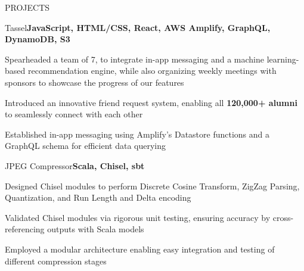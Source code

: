 \documentclass[]{resume}
\begin{document}
\vspace{-10pt}
\begin{section}{PROJECTS}
    \begin{subsection}{Tassel}{}{\textbf{JavaScript, HTML/CSS, React, AWS Amplify, GraphQL, DynamoDB, S3}}{}
        \item Spearheaded a team of 7, to integrate in-app messaging and a machine learning-based recommendation engine, while also organizing weekly meetings with sponsors to showcase the progress of our features
        \item Introduced an innovative friend request system, enabling all \textbf{120,000+ alumni} to seamlessly connect with each other
        \item Established in-app messaging using Amplify's Datastore functions and a GraphQL schema for efficient data querying
    \end{subsection}
    \begin{subsection}{JPEG Compressor}{}{\textbf{Scala, Chisel, sbt}}{}
        \item Designed Chisel modules to perform Discrete Cosine Transform, ZigZag Parsing, Quantization, and Run Length and Delta encoding
        \item Validated Chisel modules via rigorous unit testing, ensuring accuracy by cross-referencing outputs with Scala models
        \item Employed a modular architecture enabling easy integration and testing of different compression stages
    \end{subsection}
\end{section}
\vspace{-10pt}
\end{document}
